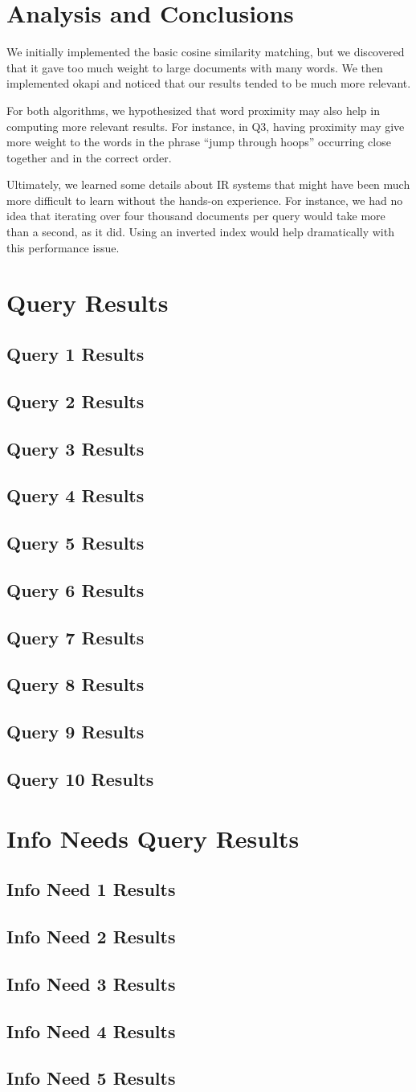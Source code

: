 \documentclass{report}
\newcommand{\results}[2]{\subsection{Query #1 Results}\begin{list}{}{}\end{list}}
\newcommand{\needresults}[2]{\subsection{Info Need #1 Results}\begin{list}{}{}\end{list}}
\newcommand{\okapi}{okapi }
\newcommand{\cosine}{cosine similarity }
\begin{document}
\section{Analysis and Conclusions}
We initially implemented the basic \cosine matching, but we discovered
that it gave too much weight to large documents with many words. We
then implemented \okapi and noticed that our results tended to be much
more relevant.

For both algorithms, we hypothesized that word proximity may also help
in computing more relevant results. For instance, in Q3, having
proximity may give more weight to the words in the phrase ``jump
through hoops'' occurring close together and in the correct order.

Ultimately, we learned some details about IR systems that might have
been much more difficult to learn without the hands-on experience. For
instance, we had no idea that iterating over four thousand documents
per query would take more than a second, as it did. Using an inverted
index would help dramatically with this performance issue.

\appendix
\section{Query Results}
\label{query-responses}
\results{1}{queryresults01.txt.tex}
\results{2}{queryresults02.txt.tex}
\results{3}{queryresults03.txt.tex}
\results{4}{queryresults04.txt.tex}
\results{5}{queryresults05.txt.tex}
\results{6}{queryresults06.txt.tex}
\results{7}{queryresults07.txt.tex}
\results{8}{queryresults08.txt.tex}
\results{9}{queryresults09.txt.tex}
\results{10}{queryresults10.txt.tex}
\section{Info Needs Query Results}
\label{need-responses}
\needresults{1}{InfoNeed01.txt.tex}
\needresults{2}{InfoNeed02.txt.tex}
\needresults{3}{InfoNeed03.txt.tex}
\needresults{4}{InfoNeed04.txt.tex}
\needresults{5}{InfoNeed05.txt.tex}
\end{document}

